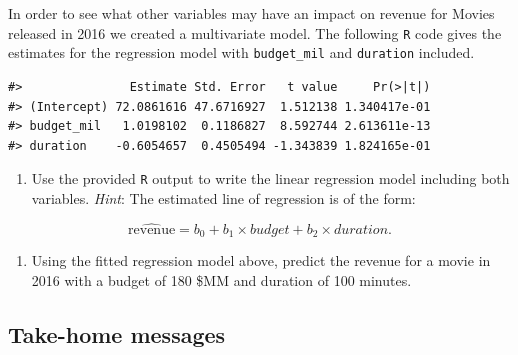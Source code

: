 \documentclass[
]{report}
\newenvironment{Shaded}{\begin{snugshade}}{\end{snugshade}}
\newcommand{\AttributeTok}[1]{\textcolor[rgb]{0.77,0.63,0.00}{#1}}
\newcommand{\CommentTok}[1]{\textcolor[rgb]{0.56,0.35,0.01}{\textit{#1}}}
\newcommand{\FunctionTok}[1]{\textcolor[rgb]{0.00,0.00,0.00}{#1}}
\newcommand{\NormalTok}[1]{#1}
\newcommand{\OtherTok}[1]{\textcolor[rgb]{0.56,0.35,0.01}{#1}}
\newcommand{\SpecialCharTok}[1]{\textcolor[rgb]{0.00,0.00,0.00}{#1}}
\providecommand{\tightlist}{%
  \setlength{\itemsep}{0pt}\setlength{\parskip}{0pt}}
\begin{document}
\vspace{1in}

In order to see what other variables may have an impact on revenue for Movies released in 2016 we created a multivariate model. The following \texttt{R} code gives the estimates for the regression model with \texttt{budget\_mil} and \texttt{duration} included.

\begin{Shaded}
\end{Shaded}

\begin{verbatim}
#>               Estimate Std. Error   t value     Pr(>|t|)
#> (Intercept) 72.0861616 47.6716927  1.512138 1.340417e-01
#> budget_mil   1.0198102  0.1186827  8.592744 2.613611e-13
#> duration    -0.6054657  0.4505494 -1.343839 1.824165e-01
\end{verbatim}

\begin{enumerate}
\def\labelenumi{\arabic{enumi}.}
\setcounter{enumi}{10}
\tightlist
\item
  Use the provided \texttt{R} output to write the linear regression model including both variables. \emph{Hint}: The estimated line of regression is of the form:
\end{enumerate}

\[\widehat{\text{revenue}} = b_0 + b_1\times budget + b_2\times duration.\]

\vspace{1in}

\begin{enumerate}
\def\labelenumi{\arabic{enumi}.}
\setcounter{enumi}{11}
\tightlist
\item
  Using the fitted regression model above, predict the revenue for a movie in 2016 with a budget of 180 \$MM and duration of 100 minutes.
\end{enumerate}

\hypertarget{take-home-messages-8}{%
\subsection{Take-home messages}\label{take-home-messages-8}}
\end{document}
